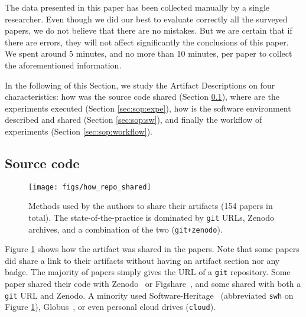 \documentclass[sigconf,natbib=false]{acmart}
\newcommand{\ad}{Artifact Description}
\begin{document}
The data presented in this paper has been collected manually by a single researcher.
Even though we did our best to evaluate correctly all the surveyed papers, we do not believe that there are no mistakes.
But we are certain that if there are errors, they will not affect significantly the conclusions of this paper.
We spent around 5 minutes, and no more than 10 minutes, per paper to collect the aforementioned information.


In the following of this Section, we study the \ad s on four characteristics: how was the source code shared (Section \ref{sec:sop:src}), where are the experiments executed (Section \ref{sec:sop:expe}), how is the software environment described and shared (Section \ref{sec:sop:sw}), and finally the workflow of experiments (Section \ref{sec:sop:workflow}).

\subsection{Source code}\label{sec:sop:src}

\begin{figure}
  \centering
  \texttt{[image: figs/how\_repo\_shared]}
  \caption{Methods used by the authors to share their artifacts (154 papers in total). The state-of-the-practice is dominated by \texttt{git} URLs, Zenodo archives, and a combination of the two (\texttt{git+zenodo}).}\label{fig:how_repo_shared}
\end{figure}

Figure \ref{fig:how_repo_shared} shows how the artifact was shared in the papers.
Note that some papers did share a link to their artifacts without having an artifact section nor any badge.
The majority of papers simply gives the URL of a \texttt{git} repository.
Some paper shared their code with Zenodo\ \cite{zenodo} or Figshare\ \cite{figshare}, and some shared with both a \texttt{git} URL and Zenodo.
A minority used Software-Heritage\ \cite{swheritage} (abbreviated \texttt{swh} on Figure \ref{fig:how_repo_shared}), Globus\ \cite{globus}, or even personal cloud drives (\texttt{cloud}).
\end{document}
